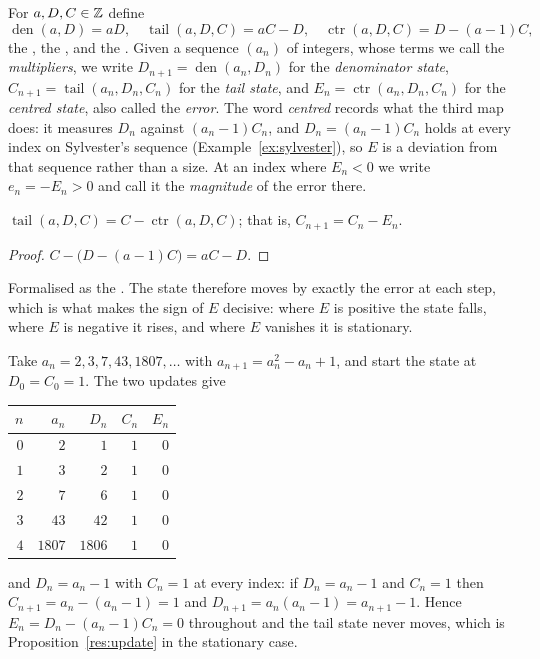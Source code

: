 \documentclass[11pt]{article}
\newcommand{\den}{\operatorname{den}}
\newcommand{\tail}{\operatorname{tail}}
\newcommand{\ctr}{\operatorname{ctr}}
\begin{document}
For $a,D,C\in\mathbb{Z}$ define
\[
 \den(a,D)=aD,
 \quad
 \tail(a,D,C)=aC-D,
 \quad
 \ctr(a,D,C)=D-(a-1)C ,
\]
the
, the
,
and the
.
Given a sequence $(a_n)$ of integers, whose terms we call the
\emph{multipliers}, we write $D_{n+1}=\den(a_n,D_n)$ for the \emph{denominator
state}, $C_{n+1}=\tail(a_n,D_n,C_n)$ for the \emph{tail state}, and
$E_n=\ctr(a_n,D_n,C_n)$ for the \emph{centred state}, also called the
\emph{error}.  The word \emph{centred} records what the third map does: it
measures $D_n$ against $(a_n-1)C_n$, and $D_n=(a_n-1)C_n$ holds at every index
on Sylvester's sequence (Example~\ref{ex:sylvester}), so $E$ is a deviation
from that sequence rather than a size.  At an index where $E_n<0$ we write
$e_n=-E_n>0$ and call it the \emph{magnitude} of the error there.

\begin{proposition}\label{res:update}
$\tail(a,D,C)=C-\ctr(a,D,C)$; that is, $C_{n+1}=C_n-E_n$.
\end{proposition}

\begin{proof}
$C-\bigl(D-(a-1)C\bigr)=aC-D$.
\end{proof}

\noindent Formalised as the
.  The state therefore moves by exactly the error at each step, which is
what makes the sign of $E$ decisive: where $E$ is positive the state falls,
where $E$ is negative it rises, and where $E$ vanishes it is stationary.

\begin{example}\label{ex:sylvester}
Take $a_n=2,3,7,43,1807,\ldots$ with $a_{n+1}=a_n^{2}-a_n+1$, and start the
state at $D_0=C_0=1$.  The two updates give

\begin{center}
\begin{tabular}{@{}rrrrr@{}}
\toprule
$n$ & $a_n$ & $D_n$ & $C_n$ & $E_n$\\
\midrule
$0$ & $2$ & $1$ & $1$ & $0$\\
$1$ & $3$ & $2$ & $1$ & $0$\\
$2$ & $7$ & $6$ & $1$ & $0$\\
$3$ & $43$ & $42$ & $1$ & $0$\\
$4$ & $1807$ & $1806$ & $1$ & $0$\\
\bottomrule
\end{tabular}
\end{center}

\noindent and $D_n=a_n-1$ with $C_n=1$ at every index: if $D_n=a_n-1$ and
$C_n=1$ then $C_{n+1}=a_n-(a_n-1)=1$ and $D_{n+1}=a_n(a_n-1)=a_{n+1}-1$.
Hence $E_n=D_n-(a_n-1)C_n=0$ throughout and the tail state never moves, which
is Proposition~\ref{res:update} in the stationary case.
\end{example}
\end{document}
